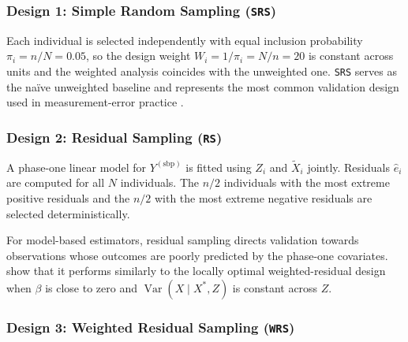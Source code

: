 \subsubsection{Design 1: Simple Random Sampling (\texttt{SRS})}

Each individual is selected independently with equal inclusion probability $\pi_i = n/N = 0.05$, so the design weight $W_i = 1/\pi_i = N/n = 20$ is constant across units and the weighted analysis coincides with the unweighted one. \texttt{SRS} serves as the na\"ive unweighted baseline and represents the most common validation design used in measurement-error practice \citep{amorim2021two}.

\subsubsection{Design 2: Residual Sampling (\texttt{RS})}

A phase-one linear model for $Y^{(\mathrm{sbp})}$ is fitted using $Z_i$ and $\tilde{X}_i$ jointly. Residuals $\hat{e}_i$ are computed for all $N$ individuals. The $n/2$ individuals with the most extreme positive residuals and the $n/2$ with the most extreme negative residuals are selected deterministically.

For model-based estimators, residual sampling directs validation towards observations whose outcomes are poorly predicted by the phase-one covariates. \citet[Sections~3 and~5]{amorim2021two} show that it performs similarly to the locally optimal weighted-residual design when $\beta$ is close to zero and $\operatorname{Var}(X\mid X^*,Z)$ is constant across $Z$.

\subsubsection{Design 3: Weighted Residual Sampling (\texttt{WRS})}

